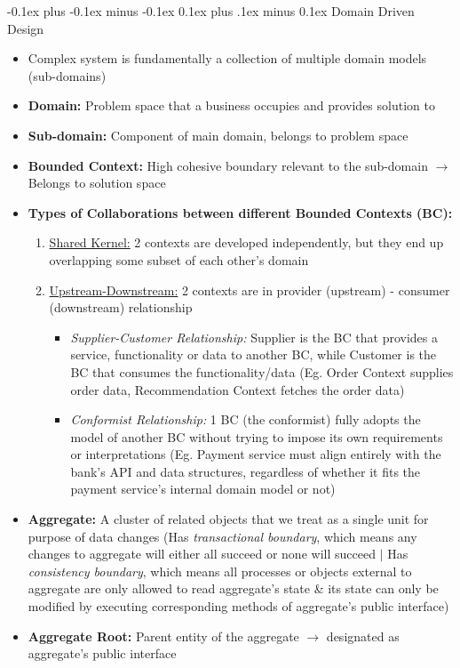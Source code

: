 \documentclass[landscape]{article}
\makeatletter
\renewcommand{\subsection}{\@startsection{subsection}{2}{0mm}%
  {-0.1ex plus -0.1ex minus -0.1ex}%
  {0.1ex plus .1ex minus 0.1ex}%
{\normalfont\scriptsize\bfseries}}
\makeatother
\begin{document}
\begin{multicols*}{5}
    \subsection{Domain Driven Design}
    \begin{itemize}
      \item Complex system is fundamentally a collection of multiple domain models (sub-domains)
      \item\textbf{Domain:} Problem space that a business occupies and provides solution to
      \item \textbf{Sub-domain:} Component of main domain, belongs to problem space
      \item \textbf{Bounded Context:} High cohesive boundary relevant to the sub-domain $\rightarrow$ Belongs to solution space
      \item \textbf{Types of Collaborations between different Bounded Contexts (BC):}
      \begin{enumerate}
        \item \underline{Shared Kernel:} 2 contexts are developed independently, but they end up overlapping some subset of each other's domain
        \item \underline{Upstream-Downstream:} 2 contexts are in provider (upstream) - consumer (downstream) relationship
        \begin{itemize}
          \item \textit{Supplier-Customer Relationship:} Supplier is the BC that provides a service, functionality or data to another BC, while Customer is the BC that consumes the functionality/data (Eg. Order Context supplies order data, Recommendation Context fetches the order data)
          \item \textit{Conformist Relationship:} 1 BC (the conformist) fully adopts the model of another BC without trying to impose its own requirements or interpretations (Eg. Payment service must align entirely with the bank's API and data structures, regardless of whether it fits the payment service's internal domain model or not)
        \end{itemize}
      \end{enumerate}
      \item \textbf{Aggregate:} A cluster of related objects that we treat as a single unit for purpose of data changes (Has \textit{transactional boundary}, which means any changes to aggregate will either all succeed or none will succeed $|$ Has \textit{consistency boundary}, which means all processes or objects external to aggregate are only allowed to read aggregate's state \& its state can only be modified by executing corresponding methods of aggregate's public interface)
      \item \textbf{Aggregate Root:} Parent entity of the aggregate $\rightarrow$ designated as aggregate's public interface
    \end{itemize}


\end{multicols*}
\end{document}
